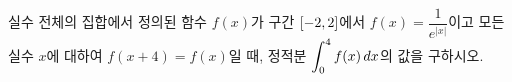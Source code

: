 실수 전체의 집합에서 정의된 함수 $f(x)$가 구간 $[-2{,}\mkern3mu\mathopen{}2]$에서 $f(x)=\dfrac{1}{e^{|x|}}$이고 모든 실수 $x$에 대하여 $f(x+4)=f(x)$일 때, 정적분 $\displaystyle\int_{0}^{4}f(x)\mkern3mu dx$의 값을 구하시오.
